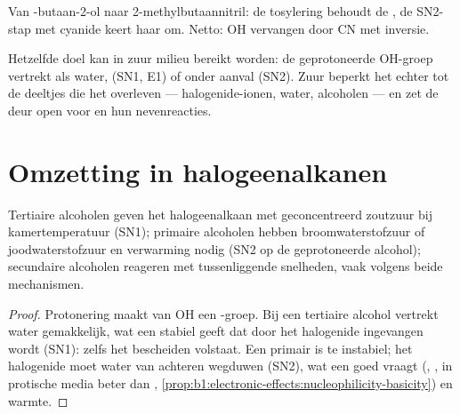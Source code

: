\begin{omfigure}

{\small Van -butaan-2-ol naar 2-methylbutaannitril: de tosylering
behoudt de , de SN2-stap met cyanide keert haar om. Netto:
OH vervangen door CN met inversie.}
\end{omfigure}

Hetzelfde doel kan in zuur milieu bereikt worden: de geprotoneerde
OH-groep vertrekt als water,  (SN1, E1) of onder
aanval (SN2). Zuur beperkt het  echter tot de deeltjes die het
overleven --- halogenide-ionen, water, alcoholen --- en zet de deur open
voor  en hun nevenreacties.

\section{Omzetting in halogeenalkanen}

\begin{proposition}\label{prop:b1:alcohol-activation:hx-by-class}
Tertiaire alcoholen geven het halogeenalkaan met geconcentreerd zoutzuur
bij kamertemperatuur (SN1); primaire alcoholen hebben
broomwaterstofzuur of joodwaterstofzuur en verwarming nodig (SN2 op de
geprotoneerde alcohol); secundaire alcoholen reageren met tussenliggende
snelheden, vaak volgens beide mechanismen.
\end{proposition}

\begin{proof}
Protonering maakt van OH een -groep. Bij een tertiaire alcohol
vertrekt water gemakkelijk, wat een stabiel  geeft dat door
het halogenide ingevangen wordt (SN1): zelfs het bescheiden 
 volstaat. Een primair  is te instabiel; het
halogenide moet water van achteren wegduwen (SN2), wat een goed
 vraagt (, , in protische media beter dan
, \cref{prop:b1:electronic-effects:nucleophilicity-basicity}) en
warmte.
\end{proof}

